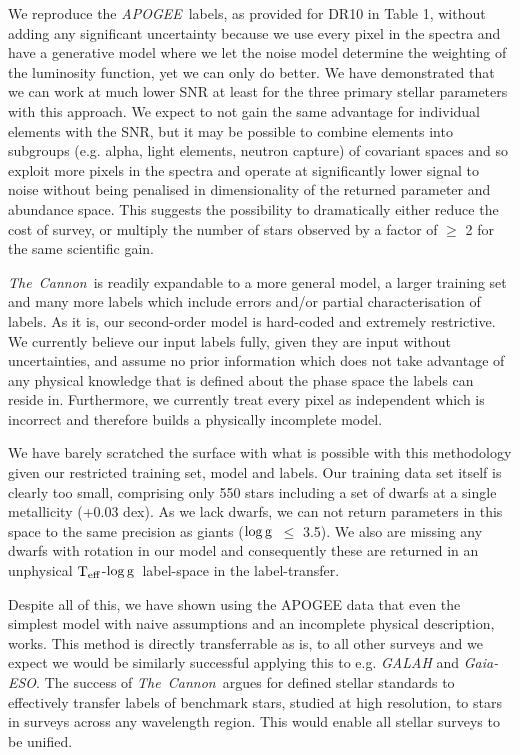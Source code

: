 \documentclass[12pt, preprint]{aastex}
\newcommand{\teff}{\mbox{$\rm T_{eff}$}}
\newcommand{\logg}{\mbox{$\rm \log g$}}
\newcommand{\tc}{\textsl{The~Cannon}}
\newcommand{\apogee}{\textsl{APOGEE}}
\newcommand{\gaiaeso}{\textsl{Gaia-ESO}}
\begin{document}
We reproduce the \apogee\ labels, as provided for DR10 in Table 1, without adding any significant uncertainty because we use every pixel in the spectra and have a generative model where we let the noise model determine the weighting of the luminosity function, yet we can only do better. We have demonstrated that we can work at much lower SNR at least for the three primary stellar parameters with this approach. We expect to not gain the same advantage for individual elements with the SNR, but it may be possible to combine elements into subgroups (e.g. alpha, light elements, neutron capture) of covariant spaces \citep[e.g.][]{Ting2012} and so exploit more pixels in the spectra and operate at significantly lower signal to noise without being penalised in dimensionality of the returned parameter and abundance space. This suggests the possibility to dramatically either reduce the cost of survey, or multiply the number of stars observed by a factor of $\ge$ 2 for the same scientific gain. 
 
 \tc\ is readily expandable to a more general model, a larger training set and many more labels which include errors and/or partial characterisation of labels. As it is, our second-order model is hard-coded and extremely restrictive. We currently believe our input labels fully, given they are input without uncertainties, and assume no prior information which does not take advantage of any physical knowledge that is defined about the phase space the labels can reside in.  Furthermore, we currently treat every pixel as independent which is incorrect and therefore builds a physically incomplete model.

 We have barely scratched the surface with what is possible with this methodology given our restricted training set, model and labels. Our training data set itself is clearly too small, comprising only 550 stars including a set of dwarfs at a single metallicity (+0.03 dex). As we lack dwarfs, we can not return parameters in this space to the same precision as giants (\logg\ $\le$ 3.5).  We also are missing any dwarfs with rotation in our model and consequently these are returned in an unphysical \teff-\logg\ label-space in the label-transfer. 
 
Despite all of this, we have shown using the APOGEE data that even the simplest model with naive assumptions and an incomplete physical description, works. This method is directly transferrable as is, to all other surveys and we expect we would be similarly successful applying this to e.g. \textit{GALAH} and \gaiaeso. The success of \tc\ argues for defined stellar standards to effectively transfer labels of benchmark stars, studied at high resolution, to stars in surveys across any wavelength region. This would enable all stellar surveys to be unified. 
 
\end{document}
